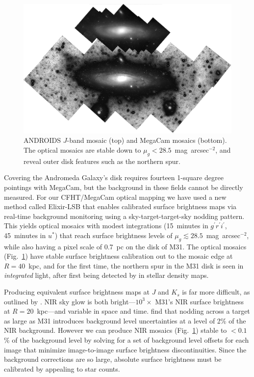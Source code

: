 \documentclass[11pt,twoside]{article}
\begin{document}
\begin{figure}[t]
\centering
\includegraphics[width=\columnwidth]{figure1}
\caption{ANDROIDS $J$-band mosaic (top) and MegaCam mosaics (bottom). The optical mosaics are stable down to $\mu_g<28.5$~mag~arcsec$^{-2}$, and reveal outer disk features such as the northern spur.}
\label{fig:mosaics}
\end{figure}

Covering the Andromeda Galaxy's disk requires fourteen 1-square degree pointings with MegaCam, but the background in these fields cannot be directly measured.
For our CFHT/MegaCam optical mapping we have used a new method called Elixir-LSB that enables calibrated surface brightness maps via real-time background monitoring  using a sky-target-target-sky nodding pattern.
This yields optical mosaics with modest integrations (15~minutes in $g^\prime r^\prime i^\prime$, 45~minutes in $u^*$) that reach surface brightness levels of $\mu_g \lesssim 28.5$~mag~arcsec$^{-2}$, while also having a pixel scale of 0.7~pc on the disk of M31.
The optical mosaics (Fig.~\ref{fig:mosaics}) have stable surface brightness calibration out to the mosaic edge at $R=40$~kpc, and for the first time, the northern spur in the M31 disk is seen in \emph{integrated} light, after first being detected by \cite{Ferguson:2002} in stellar density maps.

Producing equivalent surface brightness maps at $J$ and $K_s$ is far more difficult, as outlined by \cite{Sick:2013}.
NIR sky glow is both bright---$10^3\times$ M31's NIR surface brightness at $R=20$~kpc---and variable in space and time.
\citeauthor{Sick:2013} find that nodding across a target as large as M31 introduces background level uncertainties at a level of 2\% of the NIR background.
However we can produce NIR mosaics (Fig.~\ref{fig:mosaics}) stable to $<0.1$\% of the background level by solving for a set of background level offsets for each image that minimize image-to-image surface brightness discontinuities.
Since the background corrections are so large, absolute surface brightness must be calibrated by appealing to star counts.
\end{document}
